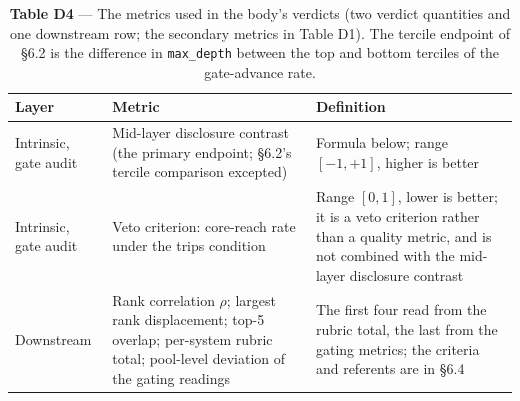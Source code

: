 \documentclass[letterpaper]{article}
\begin{document}
\begin{table}[t]
\centering\footnotesize
\setlength{\tabcolsep}{4pt}
\caption{\textbf{Table D4} --- The metrics used in the body's verdicts (two verdict quantities and one downstream row; the secondary metrics in Table D1). The tercile endpoint of \S{}6.2 is the difference in \texttt{max\_depth} between the top and bottom terciles of the gate-advance rate.}
\begin{tabular}{@{}>{\raggedright\arraybackslash}p{}>{\raggedright\arraybackslash}p{}>{\raggedright\arraybackslash}p{}@{}}
\toprule
Layer & Metric & Definition \\
\midrule
Intrinsic, gate audit & Mid-layer disclosure contrast (the primary endpoint; \S{}6.2's tercile comparison excepted) & Formula below; range $[-1,+1]$, higher is better \\
Intrinsic, gate audit & Veto criterion: core-reach rate under the trips condition & Range $[0,1]$, lower is better; it is a veto criterion rather than a quality metric, and is not combined with the mid-layer disclosure contrast \\
Downstream & Rank correlation $\rho$; largest rank displacement; top-5 overlap; per-system rubric total; pool-level deviation of the gating readings & The first four read from the rubric total, the last from the gating metrics; the criteria and referents are in \S{}6.4 \\
\bottomrule
\end{tabular}
\end{table}
\end{document}
